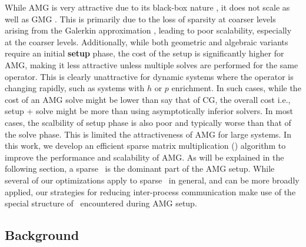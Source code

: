 While AMG is very attractive due to its black-box nature \cite{Dendy82,Vanek:1995,VanekBrezinaMandelEtAl01}, it does not scale as well as GMG \cite{Sundar12}. This is primarily due to
the loss of sparsity at coarser levels arising from the Galerkin approximation \cite{treister2015non}, leading to poor scalability, especially at the coarser levels.
Additionally, while both geometric and algebraic variants require an initial {\bf setup} phase, the cost of the setup is significantly higher for AMG, making it less attractive unless multiple solves are performed for the same operator. This is clearly unattractive for dynamic systems where the operator is changing rapidly, such as systems with $h$ or $p$ enrichment. In such cases, while the cost of an AMG solve might be lower than say that of CG, the overall cost i.e., setup + solve might be more than using asymptotically inferior solvers. In most cases, the scalbility of 
setup phase is also poor and typically worse than that of the solve phase. This is limited the attractiveness of AMG for large systems. In this work, we develop an efficient sparse matrix multiplication (\mm) algorithm to improve the performance and scalability of AMG. As will be explained in the following section, a sparse \mm\ is the dominant part of the AMG setup. While several of our optimizations apply to sparse \mm\ in general, and can be more broadly applied, our strategies for reducing inter-process communication make use of the special structure of \mm\ encountered during AMG setup.

\subsection{Background}
\label{sec:bg}

